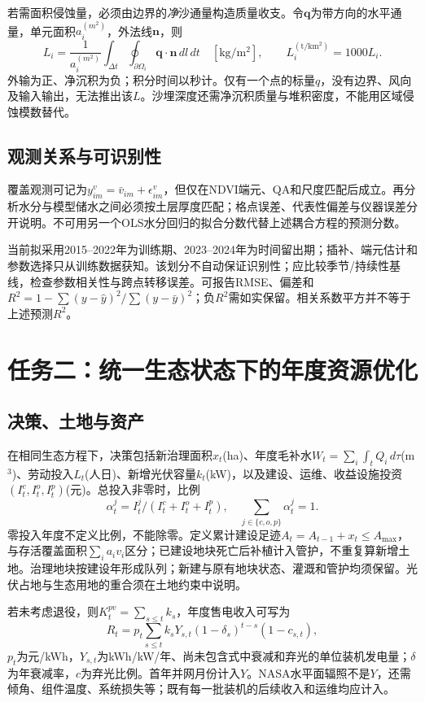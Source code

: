 \documentclass[11pt,a4paper]{ctexart}
\begin{document}
若需面积侵蚀量，必须由边界的\emph{净}沙通量构造质量收支。令$\mathbf q$为带方向的水平通量，单元面积$a_i^{(m^2)}$，外法线$\mathbf n$，则
\begin{equation}
 L_i=\frac{1}{a_i^{(m^2)}}\int_{\Delta t}\oint_{\partial\Omega_i}\mathbf q\cdot\mathbf n\,dl\,dt
 \quad[\mathrm{kg/m^2}],\qquad L_i^{(\mathrm{t/km^2})}=1000L_i.
\end{equation}
外输为正、净沉积为负；积分时间以秒计。仅有一个点的标量$q$，没有边界、风向及输入输出，无法推出该$L$。沙埋深度还需净沉积质量与堆积密度，不能用区域侵蚀模数替代。

\subsection{观测关系与可识别性}
覆盖观测可记为$y^v_{im}=\bar v_{im}+\epsilon^v_{im}$，但仅在NDVI端元、QA和尺度匹配后成立。再分析水分与模型储水之间必须按土层厚度匹配；格点误差、代表性偏差与仪器误差分开说明。不可用另一个OLS水分回归的拟合分数代替上述耦合方程的预测分数。

当前拟采用2015--2022年为训练期、2023--2024年为时间留出期；插补、端元估计和参数选择只从训练数据获知。该划分不自动保证识别性；应比较季节/持续性基线，检查参数相关性与跨点转移误差。可报告RMSE、偏差和$R^2=1-\sum(y-\hat y)^2/\sum(y-\bar y)^2$；负$R^2$需如实保留。相关系数平方并不等于上述预测$R^2$。

\section{任务二：统一生态状态下的年度资源优化}
\subsection{决策、土地与资产}
在相同生态方程下，决策包括新治理面积$x_t$(ha)、年度毛补水$W_t=\sum_i\int_{t}Q_i\,d\tau$(m$^3$)、劳动投入$L_t$(人日)、新增光伏容量$k_t$(kW)，以及建设、运维、收益设施投资$(I^c_t,I^o_t,I^p_t)$(元)。总投入非零时，比例
\begin{equation}
 \alpha^j_t=I^j_t/(I^c_t+I^o_t+I^p_t),\quad \sum_{j\in\{c,o,p\}}\alpha^j_t=1.
\end{equation}
零投入年度不定义比例，不能除零。定义累计建设足迹$A_t=A_{t-1}+x_t\leq A_{\max}$，与存活覆盖面积$\sum_i a_iv_i$区分；已建设地块死亡后补植计入管护，不重复算新增土地。治理地块按建设年形成队列；新建与原有地块状态、灌溉和管护均须保留。光伏占地与生态用地的重合须在土地约束中说明。

若未考虑退役，则$K^{pv}_t=\sum_{s\leq t}k_s$，年度售电收入可写为
\begin{equation}
 R_t=p_t\sum_{s\leq t} k_sY_{s,t}(1-\delta_s)^{t-s}(1-c_{s,t}),
\end{equation}
$p_t$为元/kWh，$Y_{s,t}$为kWh/kW/年、尚未包含式中衰减和弃光的单位装机发电量；$\delta$为年衰减率，$c$为弃光比例。首年并网月份计入$Y$。NASA水平面辐照不是$Y$，还需倾角、组件温度、系统损失等；既有每一批装机的后续收入和运维均应计入。
\end{document}
